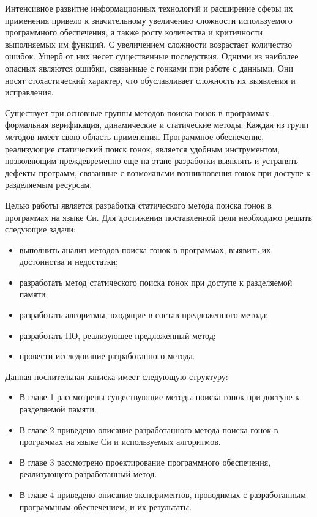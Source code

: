 \Introduction

Интенсивное развитие информационных технологий и расширение сферы их применения привело к значительному увеличению сложности используемого программного обеспечения, а также росту количества и критичности выполняемых им функций. С увеличением сложности возрастает количество ошибок. Ущерб от них несет существенные последствия. Одними из наиболее опасных являются ошибки, связанные с гонками при работе с данными. Они носят стохастический характер, что обуславливает сложность их выявления и исправления.

Существует три основные группы методов поиска гонок в программах: формальная верификация, динамические и статические методы. Каждая из групп методов имеет свою область применения. Программное обеспечение, реализующие статический поиск гонок, является удобным инструментом, позволяющим преждевременно еще на этапе разработки выявлять и устранять дефекты программ, связанные с возможными возникновения гонок при доступе к разделяемым ресурсам.

Целью работы является разработка статического метода поиска гонок в программах на языке Си. Для достижения поставленной цели необходимо решить следующие задачи:

\begin{itemize}
\item выполнить анализ методов поиска гонок в программах, выявить их достоинства и недостатки;
\item разработать метод статического поиска гонок при доступе к разделяемой памяти;
\item разработать алгоритмы, входящие в состав предложенного метода;
\item разработать ПО, реализующее предложенный метод;
\item провести исследование разработанного метода.
\end{itemize}

Данная поснительная записка имеет следующую структуру:

\begin{itemize}
  \item В главе 1 рассмотрены существующие методы поиска гонок при доступе к разделяемой памяти.
  \item В главе 2 приведено описание разработанного метода поиска гонок в программах на языке Си и используемых алгоритмов.
  \item В главе 3 рассмотрено проектирование программного обеспечения, реализующего разработанный метод.
  \item В главе 4 приведено описание экспериментов, проводимых с разработанным программным обеспечением, и их результаты.
\end{itemize}
